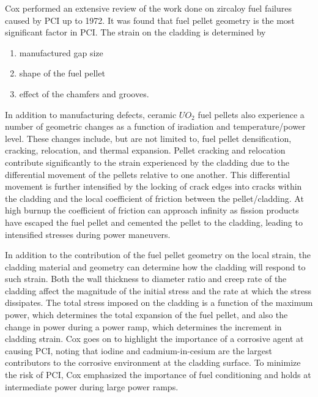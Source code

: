 \documentclass[edeposit,fullpage,11pt]{uiucthesis2009}
\begin{document}
Cox \cite{cox_pellet-clad_1990} performed an extensive review of the work done on zircaloy fuel failures caused by \gls{PCI} up to 1972.
It was found that fuel pellet geometry is the most significant factor in \gls{PCI}.
The strain on the cladding is determined by
\begin{enumerate}
\item manufactured gap size
\item shape of the fuel pellet
\item effect of the chamfers and grooves.
\end{enumerate} 
In addition to manufacturing defects, ceramic $UO_2$ fuel pellets also experience a number of geometric changes as a function of iradiation and temperature/power level.
These changes include, but are not limited to, fuel pellet  densification, cracking, relocation, and thermal expansion. 
Pellet cracking and relocation contribute significantly to the strain experienced by the cladding due to the differential movement of the pellets relative to one another.
This differential movement is further intensified  by the locking of crack edges into cracks within the cladding and the local coefficient of friction between the pellet/cladding.
At high burnup the coefficient of friction can approach infinity as fission products have escaped the fuel pellet and cemented the pellet to the cladding, leading to intensified stresses during power maneuvers. 

In addition to the contribution of the fuel pellet geometry on the local strain, the cladding material and geometry can determine how the cladding will respond to such strain.
Both the wall thickness to diameter ratio and creep rate of the cladding affect the magnitude of the initial stress and the rate at which the stress dissipates.
The total stress imposed on the cladding is a function of the maximum power, which determines the total expansion of the fuel pellet, and also the change in power during a power ramp, which determines the increment in cladding strain.
Cox goes on to highlight the importance of a corrosive agent at causing \gls{PCI}, noting that iodine and cadmium-in-cesium are the largest contributors to the corrosive environment at the cladding surface.
To minimize the risk of \gls{PCI}, Cox emphasized the importance of fuel conditioning and holds at intermediate power during large power ramps.
\end{document}
